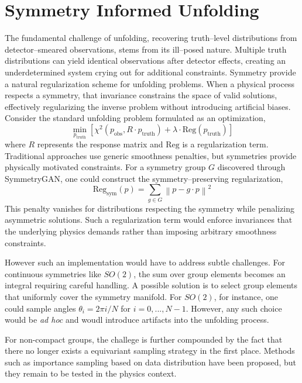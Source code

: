 \section{Symmetry Informed Unfolding}
\label{sec:symmetry-informed-unfolding}
    The fundamental challenge of unfolding, recovering truth--level distributions from detector--smeared observations, stems from its ill--posed nature.
    Multiple truth distributions can yield identical observations after detector effects, creating an underdetermined system crying out for additional constraints.
    Symmetry provide a natural regularization scheme for unfolding problems.
    When a physical process respects a symmetry, that invariance constrains the space of valid solutions, effectively regularizing the inverse problem without introducing artificial biases.
    Consider the standard unfolding problem formulated as an optimization,
    \[
        \min_{p_\text{truth}} \left[ \chi^2(p_\text{obs}, R \cdot p_\text{truth}) + \lambda \cdot \text{Reg}(p_\text{truth}) \right]
    \]
    where \(R\) represents the response matrix and \(\text{Reg}\) is a regularization term.
    Traditional approaches use generic smoothness penalties, but symmetries provide physically motivated constraints.
    For a symmetry group \(G\) discovered through SymmetryGAN, one could construct the symmetry--preserving regularization,
    \[
        \text{Reg}_\text{sym}(p) = \sum_{g \in G} \left\| p - g \cdot p \right\|^2
    \]
    This penalty vanishes for distributions respecting the symmetry while penalizing asymmetric solutions.
    Such a regularization term would enforce invariances that the underlying physics demands rather than imposing arbitrary smoothness constraints.
    
    However such an implementation would have to address subtle challenges.
    For continuous symmetries like \(SO(2)\), the sum over group elements becomes an integral requiring careful handling.
    A possible solution is to select group elements that uniformly cover the symmetry manifold.
    For \(SO(2)\), for instance, one could sample angles \(\theta_i = 2\pi i/N\) for \(i = 0, ..., N-1\).
    However, any such choice would be \textit{ad hoc} and woudl introduce artifacts into the unfolding process.

    For non-compact groups, the challege is further compounded by the fact that there no longer exists a equivariant sampling strategy in the first place.
    Methods such as importance sampling based on data distribution have been proposed, but they remain to be tested in the physics context.
    
